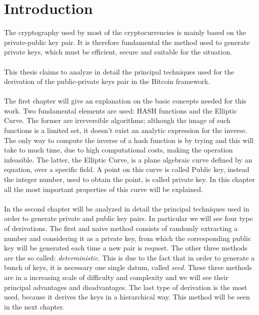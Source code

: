 
\chapter*{Introduction} %
\label{Introduction} %


The cryptography used by most of the cryptocurrencies is mainly based on the
private-public key pair. It is therefore fundamental the method used to generate
private keys, which must be efficient, secure and suitable for the situation.
\\ \\
This thesis claims to analyze in detail the principal techniques used for the derivation of the public-private keys pair in the Bitcoin framework.
\\ \\
The first chapter will give an explanation on the basic concepts needed for this work. Two fundamental elements are used: HASH functions and the Elliptic Curve. The former are irreversible algorithms; although the image of such functions is a limited set, it doesn't exist an analytic expression for the inverse. The only way to compute the inverse of a hash function is by trying and this will take to much time, due to high computational costs, making the operation infeasible.
The latter, the Elliptic Curve, is a plane algebraic curve defined by an equation, over a specific field. A point on this curve is called Public key, instead the integer number, used to obtain the point, is called private key. In this chapter all the most important properties of this curve will be explained.
\\ \\
In the second chapter will be analyzed in detail the principal techniques used in order to generate private and public key pairs. In particular we will see four type of derivations. The first and naive method consists of randomly extracting a number and considering it as a private key, from which the corresponding public key will be generated each time a new pair is request. The other three methods are the so called: \textit{deterministic}. This is due to the fact that in order to generate a bunch of keys, it is necessary one single datum, called \textit{seed}. These three methods are in a increasing scale of difficulty and complexity and we will see their principal advantages and disadvantages. The last type of derivation is the most used, because it derives the keys in a hierarchical way. This method will be seen in the next chapter.
